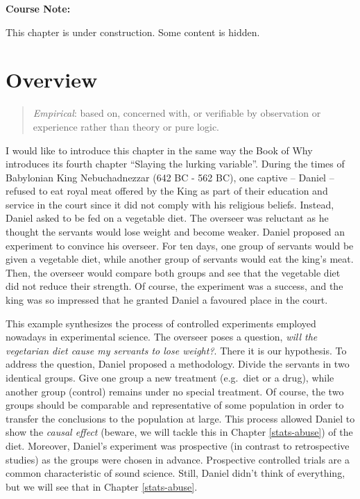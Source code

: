 \documentclass[
]{book}
\begin{document}
\begin{notebox}

\begin{center}
\textbf{Course Note:}

\end{center}

This chapter is under construction. Some content is hidden.

\end{notebox}

\hypertarget{overview-1}{%
\section{Overview}\label{overview-1}}

\begin{quote}
\emph{Empirical}: based on, concerned with, or verifiable by observation or experience rather than theory or pure logic.
\end{quote}

I would like to introduce this chapter in the same way the Book of Why \citep{book-of-why} introduces its fourth chapter ``Slaying the lurking variable''. During the times of Babylonian King Nebuchadnezzar (642 BC - 562 BC), one captive -- Daniel -- refused to eat royal meat offered by the King as part of their education and service in the court since it did not comply with his religious beliefs. Instead, Daniel asked to be fed on a vegetable diet. The overseer was reluctant as he thought the servants would lose weight and become weaker. Daniel proposed an experiment to convince his overseer. For ten days, one group of servants would be given a vegetable diet, while another group of servants would eat the king's meat. Then, the overseer would compare both groups and see that the vegetable diet did not reduce their strength. Of course, the experiment was a success, and the king was so impressed that he granted Daniel a favoured place in the court.

This example synthesizes the process of controlled experiments employed nowadays in experimental science. The overseer poses a question, \emph{will the vegetarian diet cause my servants to lose weight?}. There it is our hypothesis. To address the question, Daniel proposed a methodology. Divide the servants in two identical groups. Give one group a new treatment (e.g.~diet or a drug), while another group (control) remains under no special treatment. Of course, the two groups should be comparable and representative of some population in order to transfer the conclusions to the population at large. This process allowed Daniel to show the \emph{causal effect} (beware, we will tackle this in Chapter \ref{stats-abuse}) of the diet. Moreover, Daniel's experiment was prospective (in contrast to retrospective studies) as the groups were chosen in advance. Prospective controlled trials are a common characteristic of sound science. Still, Daniel didn't think of everything, but we will see that in Chapter \ref{stats-abuse}.
\end{document}

